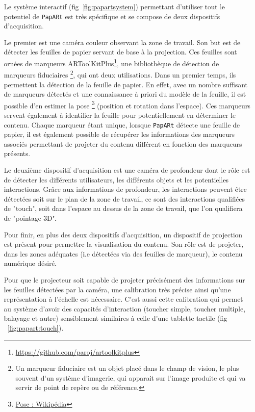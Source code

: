 Le système interactif (fig~\ref{fig:papartsystem}) permettant d'utiliser tout le potentiel de \texttt{PapARt} est très spécifique et se compose de deux dispositifs d'acquisition.

Le premier est une caméra couleur observant la zone de travail. Son but est de détecter les feuilles de papier servant de base à la projection. Ces feuilles sont ornées de marqueurs ARToolKitPlus\footnote{\href{https://github.com/paroj/artoolkitplus}{https://github.com/paroj/artoolkitplus}}, une bibliothèque de détection de marqueurs fiduciaires \footnote{Un marqueur fiduciaire est un objet placé dans le champ de vision, le plus souvent d'un système d'imagerie, qui apparait sur l'image produite et qui va servir de point de repère ou de référence.}, qui ont deux utilisations. 
Dans un premier temps, ils permettent la détection de la feuille de papier. En effet, avec un nombre suffisant de marqueurs détectés et une connaissance à priori du modèle de la feuille, il est possible d'en estimer la pose \footnote{\href{https://en.wikipedia.org/wiki/Pose_(computer_vision)}{Pose : Wikipédia}} (position et rotation dans l'espace). 
Ces marqueurs servent également à identifier la feuille pour potentiellement en déterminer le contenu. Chaque marqueur étant unique, lorsque \texttt{PapARt} détecte une feuille de papier, il est également possible de récupérer les informations des marqueurs associés permettant de projeter du contenu différent en fonction des marqueurs présents.

Le deuxième dispositif d'acquisition est une caméra de profondeur dont le rôle est de détecter les différents utilisateurs, les différents objets et les potentielles interactions. Grâce aux informations de profondeur, les interactions peuvent être détectées soit sur le plan de la zone de travail, ce sont des interactions qualifiées de "touch", soit dans l'espace au dessus de la zone de travail, que l'on qualifiera de "pointage 3D".

Pour finir, en plus des deux dispositifs d'acquisition, un dispositif de projection est présent pour permettre la visualisation du contenu. Son rôle est de projeter, dans les zones adéquates (i.e détectées via des feuilles de marqueur), le contenu numérique désiré.

Pour que le projecteur soit capable de projeter précisément des informations sur les feuilles détectées par la caméra, une calibration très précise ainsi qu'une représentation à l'échelle est nécessaire. C'est aussi cette calibration qui permet au système d'avoir des capacités d'interaction (toucher simple, toucher multiple, balayage et autre) sensiblement similaires à celle d'une tablette tactile (fig ~\ref{fig:papart:touch}).

